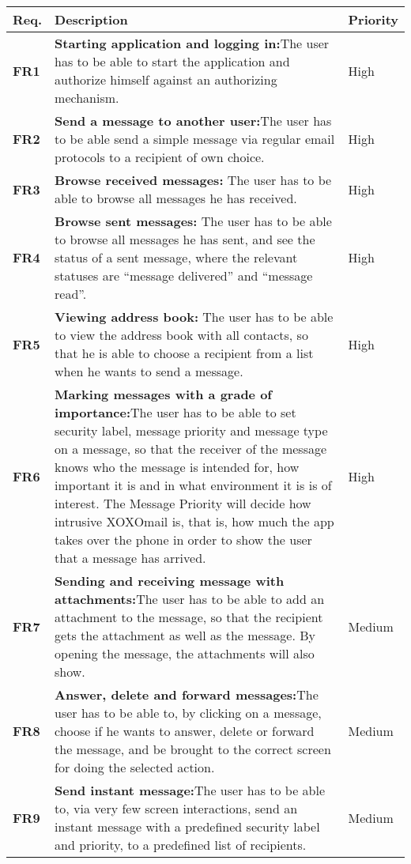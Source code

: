 \begin{table}
\begin{tabular}{p{1.5cm}|p{12.5cm}|p{2cm}}
\textbf{Req.} & \textbf{Description} & \textbf{Priority} \\ \hline \hline
\textbf{FR1} & \textbf{Starting application and logging in:}The user has to be able to start the application and authorize himself against an authorizing mechanism. & High \\ \hline
\textbf{FR2} & \textbf{Send a message to another user:}The user has to be able send a simple message via regular email protocols to a recipient of own choice. & High \\ \hline
\textbf{FR3} & \textbf{Browse received messages:} The user has to be able to browse all messages he has received. & High \\ \hline
\textbf{FR4} & \textbf{Browse sent messages:} The user has to be able to browse all messages he has sent, and see the status of a sent message, where the relevant statuses are “message delivered” and “message read”. & High \\ \hline
\textbf{FR5} & \textbf{Viewing address book:} The user has to be able to view the address book with all contacts, so that he is able to choose a recipient from a list when he wants to send a message. & High \\ \hline
\textbf{FR6} & \textbf{Marking messages with a grade of importance:}The user has to be able to set security label, message priority and message type on a message, so that the receiver of the message knows who the message is intended for, how important it is and in what environment it is is of interest. The Message Priority will decide how intrusive XOXOmail is, that is, how much the app takes over the phone in order to show the user that a message has arrived.  & High \\ \hline
\textbf{FR7} & \textbf{Sending and receiving message with attachments:}The user has to be able to add an attachment to the message, so that the recipient gets the attachment as well as the message. By opening the message, the attachments will also show. & Medium \\ \hline
\textbf{FR8} & \textbf{Answer, delete and forward messages:}The user has to be able to, by clicking on a message, choose if he wants to answer, delete or forward the message, and be brought to the correct screen for doing the selected action. & Medium \\ \hline
\textbf{FR9} & \textbf{Send instant message:}The user has to be able to, via very few screen interactions, send an instant message with a predefined security label and priority, to a predefined list of recipients. & Medium \\ \hline

\end{tabular}
\end{table}
